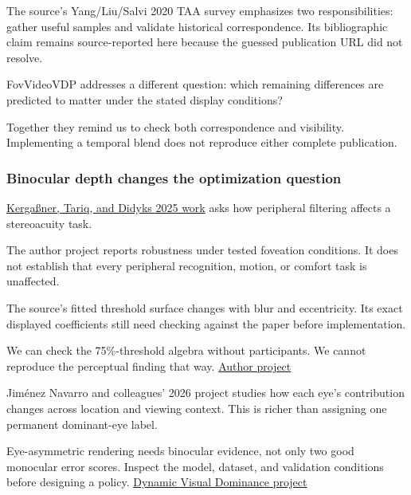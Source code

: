 \hypertarget{04-visual-computing-ii-ch043-matching-samples-across-time-and-predicting-their-visible-error}{}

The source's Yang/Liu/Salvi 2020 TAA survey emphasizes two responsibilities: gather useful samples and validate historical correspondence. Its bibliographic claim remains source-reported here because the guessed publication URL did not resolve.

FovVideoVDP addresses a different question: which remaining differences are predicted to matter under the stated display conditions?

Together they remind us to check both correspondence and visibility. Implementing a temporal blend does not reproduce either complete publication.

\subsubsection{Binocular depth changes the optimization question}\label{04-visual-computing-ii-ch043-binocular-depth-changes-the-optimization-question}

\hypertarget{04-visual-computing-ii-ch043-binocular-depth-changes-the-optimization-question}{}

\hyperref[appendix-8dc848f14052]{Kergaßner, Tariq, and Didyk\textquotesingle s 2025 work} asks how peripheral filtering affects a stereoacuity task.

The author project reports robustness under tested foveation conditions. It does not establish that every peripheral recognition, motion, or comfort task is unaffected.

The source's fitted threshold surface changes with blur and eccentricity. Its exact displayed coefficients still need checking against the paper before implementation.

We can check the 75\%-threshold algebra without participants. We cannot reproduce the perceptual finding that way. \href{https://sophie-kergassner.github.io/depth-in-periphery.html}{Author project}

Jiménez Navarro and colleagues' 2026 project studies how each eye's contribution changes across location and viewing context. This is richer than assigning one permanent dominant-eye label.

Eye-asymmetric rendering needs binocular evidence, not only two good monocular error scores. Inspect the model, dataset, and validation conditions before designing a policy. \href{https://dynamicvisualdominance.mpi-inf.mpg.de/}{Dynamic Visual Dominance project}

